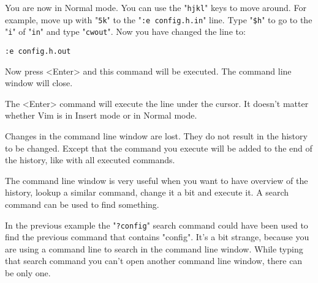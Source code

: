 You are now in Normal mode.
You can use the "\texttt{hjkl}" keys to move around.
For example, move up with "\texttt{5k}" to the "\texttt{:e config.h.in}" line.
Type "\texttt{\$h}" to go to the "\texttt{i}" of "\texttt{in}" and type "\texttt{cwout}".
Now you have changed the line to:

\begin{Verbatim}[samepage=true]
    :e config.h.out 
\end{Verbatim}

Now press <Enter> and this command will be executed.
The command line window will close.

The <Enter> command will execute the line under the cursor.
It doesn't matter whether Vim is in Insert mode or in Normal mode.

Changes in the command line window are lost.
They do not result in the history to be changed.
Except that the command you execute will be added to the end of the history, like with all executed commands.

The command line window is very useful when you want to have overview of the history, lookup a similar command, change it a bit and execute it.
A search command can be used to find something.

In the previous example the "\texttt{?config}" search command could have been used to find the previous command that contains "config".
It's a bit strange, because you are using a command line to search in the command line window.
While typing that search command you can't open another command line window, there can be only one.
\clearpage
